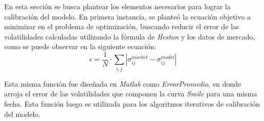 \noindent En esta sección se busca plantear los elementos necesarios para lograr la calibración del modelo. En primera instancia, se planteó la ecuación objetivo a minimizar en el problema de optimización, buscando reducir el error de las volatilidades calculadas utilizando la fórmula de \textit{Heston} y los datos de mercado, como se puede observar en la siguiente ecuación:
\begin{equation}
\epsilon=\frac{1}{N} \cdot \sum_{i, j}\left|\sigma_{i j}^{m a r k e t}-\sigma_{i j}^{m o d e l}\right|
\label{error}
\end{equation}

\noindent Esta misma función fue diseñada en \textit{Matlab} como \textit{ErrorPromedio}, en donde arroja el error de las volatilidades que componen la curva \textit{Smile} para una misma fecha. Esta función luego es utilizada para los algoritmos iterativos de calibración del modelo.
\newpage